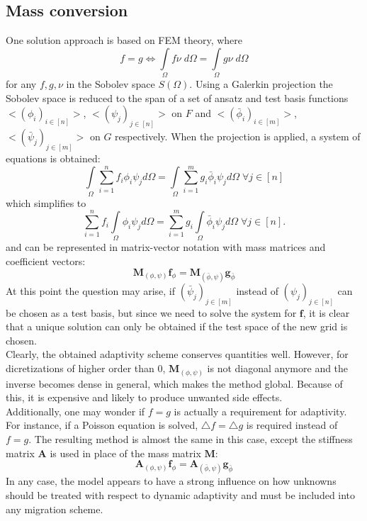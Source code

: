 \documentclass{IOS-Book-Article}
\theoremstyle{plain}
\theoremstyle{definition}
\begin{document}
\subsection{Mass conversion}
One solution approach is based on FEM theory, where
$$f = g \Leftrightarrow \int \limits_{\Omega} f \nu \; d\Omega = \int \limits_{\Omega} g \nu \; d\Omega$$
for any $f, g, \nu$ in the Sobolev space $S(\Omega)$. Using a Galerkin projection the Sobolev space is reduced to the span of a set of ansatz and test basis functions $<(\phi_i)_{i \in [n]}>$, $<(\psi_j)_{j \in [n]}>$ on $F$ and $<(\bar \phi_i)_{i \in [m]}>$, $<(\bar \psi_j)_{j \in [m]}>$ on $G$ respectively. When the projection is applied, a system of equations is obtained:
$$\int \limits_{\Omega} \sum \limits_{i=1}^n f_i \phi_i \psi_j d\Omega = \int \limits_{\Omega} \sum \limits_{i=1}^m g_i \bar \phi_i \psi_j d\Omega \; \forall j \in [n]$$
which simplifies to
$$\sum \limits_{i=1}^n f_i \int \limits_{\Omega} \phi_i \psi_j d\Omega = \sum \limits_{i=1}^m g_i \int \limits_{\Omega} \bar \phi_i \psi_j d\Omega \; \forall j \in [n].$$
and can be represented in matrix-vector notation with mass matrices and coefficient vectors:
\begin{equation}
 \mathbf M_{(\phi, \psi)} \mathbf f_\phi = \mathbf M_{(\bar \phi, \psi)} \mathbf g_{\bar \phi}
\end{equation}
At this point the question may arise, if $(\bar \psi_j)_{j \in [m]}$ instead of $(\psi_j)_{j \in [n]}$ can be chosen as a test basis, but since we need to solve the system for $\mathbf f$, it is clear that a unique solution can only be obtained if the test space of the new grid is chosen.\\

Clearly, the obtained adaptivity scheme conserves quantities well. However, for dicretizations of higher order than $0$, $\mathbf M_{(\phi, \psi)}$ is not diagonal anymore and the inverse becomes dense in general, which makes the method global. Because of this, it is expensive and likely to produce unwanted side effects. \\
Additionally, one may wonder if $f = g$ is actually a requirement for adaptivity. For instance, if a Poisson equation is solved, $\bigtriangleup f = \bigtriangleup g$ is required instead of $f = g$. The resulting method is almost the same in this case, except the stiffness matrix $\mathbf A$ is used in place of the mass matrix $\mathbf M$:
\begin{equation}
 \mathbf A_{(\phi, \psi)} \mathbf f_\phi = \mathbf A_{(\bar \phi, \psi)} \mathbf g_{\bar \phi}
\end{equation}
In any case, the model appears to have a strong influence on how unknowns should be treated with respect to dynamic adaptivity and must be included into any migration scheme.
\end{document}
